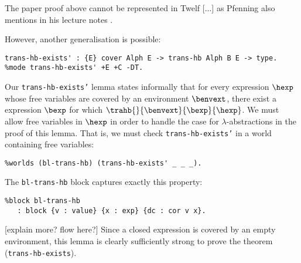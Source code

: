The paper proof above cannot be represented in Twelf [...] as Pfenning also mentions in his lecture notes \cite{Pfenning01}.




However, another generalisation is possible:
\begin{verbatim}
trans-hb-exists' : {E} cover Alph E -> trans-hb Alph B E -> type.
%mode trans-hb-exists' +E +C -DT.
\end{verbatim}
Our \texttt{trans-hb-exists'} lemma states informally that for every \hlang expression $\hexp$ whose free variables are covered by an environment $\benvext$, there exist a \blang expression $\bexp$ for which $\trahb{}{\benvext}{\bexp}{\hexp}$.
We must allow free variables in $\hexp$ in order to handle the case for $\lambda$-abstractions in the proof of this lemma.
That is, we must check \texttt{trans-hb-exists'} in a world containing free variables:
\begin{verbatim}
%worlds (bl-trans-hb) (trans-hb-exists' _ _ _).
\end{verbatim}
The \texttt{bl-trans-hb} block captures exactly this property:
\begin{verbatim}
%block bl-trans-hb
   : block {v : value} {x : exp} {dc : cor v x}.
\end{verbatim}
[explain more? flow here?]
Since a closed expression is covered by an empty environment, this lemma is clearly sufficiently strong to prove the theorem (\texttt{trans-hb-exists}).

